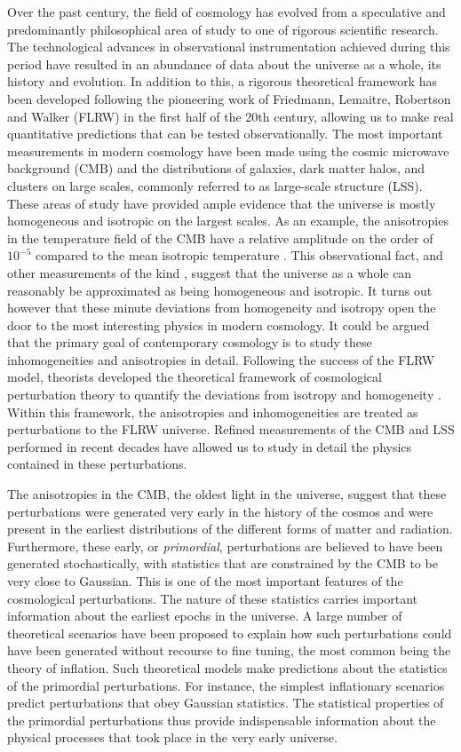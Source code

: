 \documentclass[10pt,letterpaper,final]{iopart}
\numberwithin{equation}{subsection}
\begin{document}
Over the past century, the field of cosmology has evolved from a speculative and predominantly philosophical area of study to one of rigorous scientific research. The technological advances in observational instrumentation achieved during this period have resulted in an abundance of data about the universe as a whole, its history and evolution. In addition to this, a rigorous theoretical framework has been developed following the pioneering work of Friedmann, Lemaitre, Robertson and Walker (FLRW) in the first half of the 20th century, allowing us to make real quantitative predictions that can be tested observationally. The most important measurements in modern cosmology have been made using the cosmic microwave background (CMB) and the distributions of galaxies, dark matter halos, and clusters on large scales, commonly referred to as large-scale structure (LSS). These areas of study have provided ample evidence that the universe is mostly homogeneous and isotropic on the largest scales. As an example, the anisotropies in the temperature field of the CMB have a relative amplitude on the order of $10^{-5}$ compared to the mean isotropic temperature \cite{Schneider}. This observational fact, and other measurements of the kind \cite{Schneider}, suggest that the universe as a whole can reasonably be approximated as being homogeneous and isotropic. It turns out however that these minute deviations from homogeneity and isotropy open the door to the most interesting physics in modern cosmology. It could be argued that the primary goal of contemporary cosmology is to study these inhomogeneities and anisotropies in detail. Following the success of the FLRW model, theorists developed the theoretical framework of cosmological perturbation theory to quantify the deviations from isotropy and homogeneity \cite{Peebles}.  Within this framework, the anisotropies and inhomogeneities are treated as perturbations to the FLRW universe. Refined measurements of the CMB and LSS performed in recent decades have allowed us to study in detail the physics contained in these perturbations.

The anisotropies in the CMB, the oldest light in the universe, suggest that these perturbations were generated very early in the history of the cosmos and were present in the earliest distributions of the different forms of matter and radiation. Furthermore, these early, or \emph{primordial}, perturbations are believed to have been generated stochastically, with statistics that are constrained by the CMB to be very close to Gaussian. This is one of the most important features of the cosmological perturbations. The nature of these statistics carries important information about the earliest epochs in the universe. A large number of theoretical scenarios have been proposed to explain how such perturbations could have been generated without recourse to fine tuning, the most common being the theory of inflation. Such theoretical models make predictions about the statistics of the primordial perturbations. For instance, the simplest inflationary scenarios predict perturbations that obey Gaussian statistics. The statistical properties of the primordial perturbations thus provide indispensable information about the physical processes that took place in the very early universe. 
\end{document}
